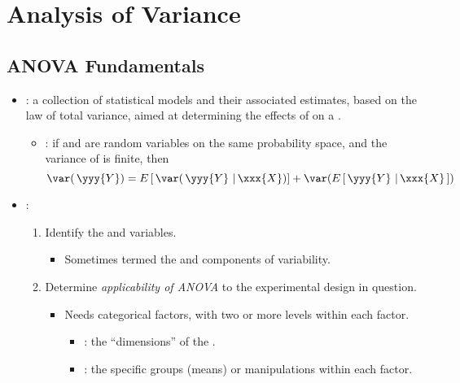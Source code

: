 \chapter{Analysis of Variance}

\section{ANOVA Fundamentals}
\begin{itemize}
  \item {}: a collection of statistical models and their associated estimates, based on the law of total variance, aimed at determining the effects of  on a .
    \begin{itemize}
      \item {}: if  and  are random variables on the same probability space, and the variance of  is finite, then
      \[%
      \var(\,\yyy{Y}) = E\,[\,\var(\,\yyy{Y}~|\,\xxx{X})] + \var(E\,[\,\yyy{Y}~|\,\xxx{X}\,])
      \]%
    \end{itemize}
  \item {}:
    \begin{enumerate}
      \item Identify the  and  variables.
      \begin{itemize}
        \item Sometimes termed the  and  components of variability.
      \end{itemize}
      \item Determine \emph{applicability of ANOVA} to the experimental design in question.
        \begin{itemize}
          \item Needs categorical factors, with two or more levels within each factor.
            \begin{itemize}
              \item {}: the ``dimensions'' of the .
              \item {}: the specific groups (means) or manipulations within each factor.
            \end{itemize}

\end{itemize}
\end{enumerate}
\end{itemize}
